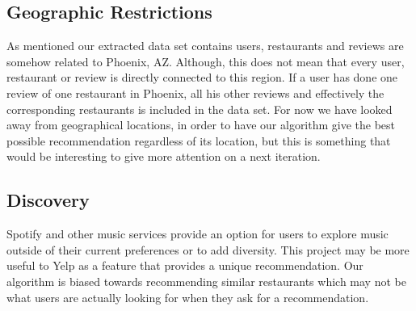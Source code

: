 \documentclass[10pt,twocolumn,letterpaper]{article}
\begin{document}
\subsection{Geographic Restrictions}
As mentioned our extracted data set contains users, restaurants and reviews are somehow related to Phoenix, AZ. Although, this does not mean that every user, restaurant or review is directly connected to this region. If a user has done one review of one restaurant in Phoenix, all his other reviews and effectively the corresponding restaurants is included in the data set. For now we have looked away from geographical locations, in order to have our algorithm give the best possible recommendation regardless of its location, but this is something that would be interesting to give more attention on a next iteration.

\subsection{Discovery}
Spotify and other music services provide an option for users to explore music outside of their current preferences or to add diversity. This project may be more useful to Yelp as a feature that provides a unique recommendation. Our algorithm is biased towards recommending similar restaurants which may not be what users are actually looking for when they ask for a recommendation.


{\small

}
\end{document}
